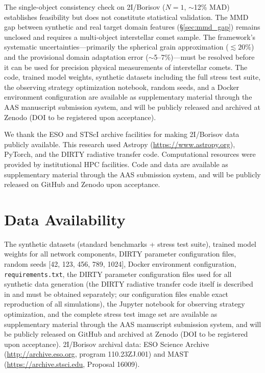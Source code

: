 \documentclass[preprint2]{aastex631}
\begin{document}
The single-object consistency check on 2I/Borisov ($N=1$, $\sim$12\% MAD) establishes feasibility but does not constitute statistical validation. The MMD gap between synthetic and real target domain features (\S\ref{sec:mmd_gap}) remains unclosed and requires a multi-object interstellar comet sample. The framework's systematic uncertainties---primarily the spherical grain approximation ($\lesssim 20\%$) and the provisional domain adaptation error ($\sim$5--7\%)---must be resolved before it can be used for precision physical measurements of interstellar comets. The code, trained model weights, synthetic datasets including the full stress test suite, the observing strategy optimization notebook, random seeds, and a Docker environment configuration are available as supplementary material through the AAS manuscript submission system, and will be publicly released and archived at Zenodo (DOI to be registered upon acceptance).

\begin{acknowledgments}
We thank the ESO and STScI archive facilities for making 2I/Borisov data publicly available. This research used Astropy (\url{https://www.astropy.org}), PyTorch, and the DIRTY radiative transfer code. Computational resources were provided by institutional HPC facilities. Code and data are available as supplementary material through the AAS submission system, and will be publicly released on GitHub and Zenodo upon acceptance.
\end{acknowledgments}

\section*{Data Availability}
The synthetic datasets (standard benchmarks + stress test suite), trained model weights for all network components, DIRTY parameter configuration files, random seeds [42, 123, 456, 789, 1024], Docker environment configuration, \texttt{requirements.txt}, the DIRTY parameter configuration files used for all synthetic data generation (the DIRTY radiative transfer code itself is described in \citet{gordon01} and must be obtained separately; our configuration files enable exact reproduction of all simulations), the Jupyter notebook for observing strategy optimization, and the complete stress test image set are available as supplementary material through the AAS manuscript submission system, and will be publicly released on GitHub and archived at Zenodo (DOI to be registered upon acceptance). 2I/Borisov archival data: ESO Science Archive (\url{http://archive.eso.org}, program 110.23ZJ.001) and MAST (\url{https://archive.stsci.edu}, Proposal 16009).


\end{document}
